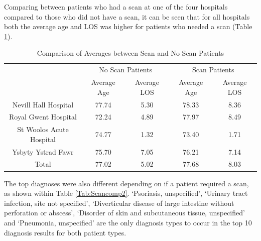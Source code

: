 \documentclass[../thesis.tex]{subfiles}
\begin{document}
Comparing between patients who had a scan at one of the four hospitals compared to those who did not have a scan, it can be seen that for all hospitals both the average age and LOS was higher for patients who needed a scan (Table \ref{Tab:Scancomp}).
\begin{table}[H]
    \centering
\begin{tabular}{ccccc}
\toprule
\multirow{2}{*}{} & \multicolumn{2}{c}{{No Scan Patients}} & \multicolumn{2}{c}{{Scan Patients}}  \\
& {Average Age}& {Average LOS} &Average Age& {Average LOS} \\\midrule
Nevill Hall Hospital  & 77.74& 5.30 &78.33 & 8.36\\
Royal Gwent Hospital &72.24 &4.89&77.97&8.49\\
St Woolos Acute Hospital & 74.77 &1.32 &73.40 &1.71\\
Ysbyty Ystrad Fawr &75.70 &7.05&76.21&7.14\\%
Total &77.02 & 5.02 & 77.68 &8.03\\
\bottomrule
    \end{tabular}
    \caption{Comparison of Averages between Scan and No Scan Patients}
    \label{Tab:Scancomp}
\end{table}

The top diagnoses were also different depending on if a patient required a scan, as shown within Table \ref{Tab:Scancomp2}. `Psoriasis, unspecified', `Urinary tract infection, site not specified', `Diverticular disease of large intestine without perforation or abscess', `Disorder of skin and subcutaneous tissue, unspecified' and `Pneumonia, unspecified' are the only diagnosis types to occur in the top 10 diagnosis results for both patient types. 
\end{document}
